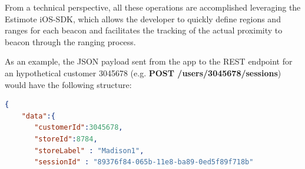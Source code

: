 From a technical perspective, all these operations are accomplished leveraging the Estimote iOS-SDK\cite{estimote-ios-sdk}, which allows the developer to quickly define regions and ranges for each beacon and facilitates the tracking of the actual proximity to beacon through the ranging process.

As an example, the JSON payload sent from the app to the REST endpoint for an hypothetical customer 3045678 (e.g. \textbf{POST /users/3045678/sessions}) would have the following structure:


\vspace{0.5cm}
\begin{lstlisting}[language=json,firstnumber=1]
  {
    "data":{
       "customerId":3045678,
       "storeId":8784,
       "storeLabel" : "Madison1",
       "sessionId" : "89376f84-065b-11e8-ba89-0ed5f89f718b"


\end{lstlisting}
